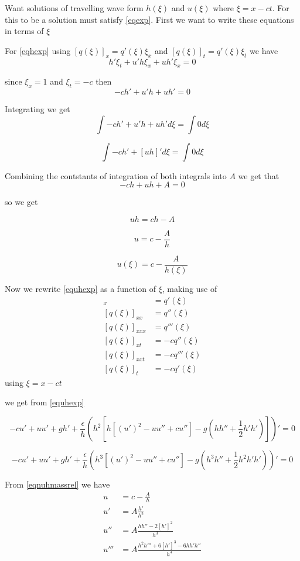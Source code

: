 \documentclass[subeqn]{article}
\begin{document}
Want solutions of travelling wave form $h(\xi)$ and $u(\xi)$ where $\xi = x - ct$. For this to be a solution must satisfy \eqref{eqexp}. First we want to write these equations in terms of $\xi$

For \eqref{eqhexp} using $[q(\xi)]_x = q'(\xi)\xi_x$ and $[q(\xi)]_t = q'(\xi)\xi_t$ we have
\[h' \xi_t + u'h\xi_x + u h'\xi_x = 0\]

since $\xi_x = 1$ and $\xi_t = -c$ then
\[-c h' + u'h + u h' = 0\]

Integrating we get
\[ \int -c h' + u'h + u h' d\xi =  \int 0 d\xi\]

\[ \int -c h' + \left[uh\right]' d\xi =  \int 0 d\xi\]

Combining the contstants of integration of both integrals into $A$ we get that
\[ -ch + uh + A = 0  \]

so we get

\[ uh = ch - A  \]

\[ u = c - \frac{A}{h}  \]

\begin{equation}
\label{eqnuhmassrel}
u(\xi) = c - \frac{A}{h(\xi)} 
\end{equation}

Now we rewrite \eqref{equhexp} as a function of $\xi$, making use of 
\begin{align*}
[q(\xi)]_x &= q'(\xi) \\
[q(\xi)]_{xx} &= q''(\xi) \\
[q(\xi)]_{xxx} &= q'''(\xi) \\
[q(\xi)]_{xt} &= -c q''(\xi) \\
[q(\xi)]_{xxt} &= -c q'''(\xi) \\
[q(\xi)]_t &= -c q'(\xi)
\end{align*}
using $\xi = x - ct$

we get from \eqref{equhexp}

\[	-cu' +  u u'  + gh' + \frac{\epsilon}{h}\left( h^2 \left[h\left[\left(u' \right)^2 - uu'' + cu'' \right]  - g \left ( h h''  + \dfrac{1}{2} h'h' \right )\right]\right)' = 0\]

\[	-cu' +  u u'  + gh' + \frac{\epsilon}{h}\left( h^3 \left[\left(u' \right)^2 - uu'' + cu'' \right]  - g \left ( h^3 h''  + \dfrac{1}{2}  h^2h'h' \right )\right)' = 0\]

From \eqref{eqnuhmassrel} we have
\begin{align*}
u &= c - \frac{A}{h} \\
u' &= A \frac{h'}{h^2} \\
u'' &= A \frac{h h'' - 2\left[h'\right]^2}{h^3} \\
u''' &= A \frac{h^2 h''' + 6 \left[h'\right]^3 - 6hh'h''}{h^4} \\
\end{align*}
\end{document}
